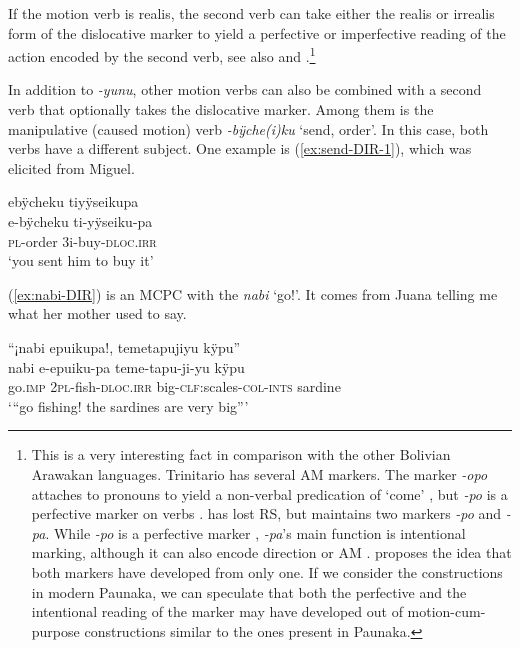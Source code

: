 If the motion verb is realis, the second verb can take either the realis or irrealis form of the dislocative marker to yield a perfective or imperfective reading of the action encoded by the second verb, see also  and .\footnote{\label{fn:pu_Baure_Trinitario}This is a very interesting fact in comparison with the other Bolivian Arawakan languages. Trinitario has several AM markers. The marker \textit{-opo} attaches to pronouns to yield a non-verbal predication of ‘come’ \citep[139]{Rose2015}, but \textit{-po} is a perfective marker on verbs \citep[82]{Rose2014}.  has lost RS, but maintains two markers \textit{-po} and \textit{-pa}. While \textit{-po} is a perfective marker \citep[262]{Danielsen2007}, \textit{-pa}’s main function is intentional marking, although it can also encode direction or AM \citep[221--223]{Admiraal2016}. \citet[]{Danielsen2012} proposes the idea that both markers have developed from only one. If we consider the constructions in modern Paunaka, we can speculate that both the perfective and the intentional reading of the  marker may have developed out of motion-cum-purpose constructions similar to the ones present in Paunaka.}


In addition to \textit{-yunu}, other motion verbs can also be combined with a second verb that optionally takes the dislocative marker. Among them is the manipulative (caused motion) verb \textit{-bÿche(i)ku} ‘send, order’. In this case, both verbs have a different subject. One example is (\ref{ex:send-DIR-1}), which was elicited from Miguel.

\ea\label{ex:send-DIR-1}
\begingl 
\glpreamble ebÿcheku tiyÿseikupa\\
\gla e-bÿcheku ti-yÿseiku-pa\\ 
\textsc{pl}-order 3i-buy-\textsc{dloc.irr}\\ 
\glft ‘you sent him to buy it’\\ 
\endgl
{}
\xe

(\ref{ex:nabi-DIR}) is an MCPC with the  \textit{nabi} ‘go!’. It comes from Juana telling me what her mother used to say.


\ea\label{ex:nabi-DIR}
\begingl 
\glpreamble “¡nabi epuikupa!, temetapujiyu kÿpu”\\
\gla nabi e-epuiku-pa teme-tapu-ji-yu kÿpu\\ 
\glb go.\textsc{imp} 2\textsc{pl}-fish-\textsc{dloc.irr} big-\textsc{clf:}scales-\textsc{col}-\textsc{ints} sardine\\ 
\glft ‘“go fishing! the sardines are very big”’\\ 
\endgl
\trailingcitation{[jxx-e150925l-1.160]}
\xe

